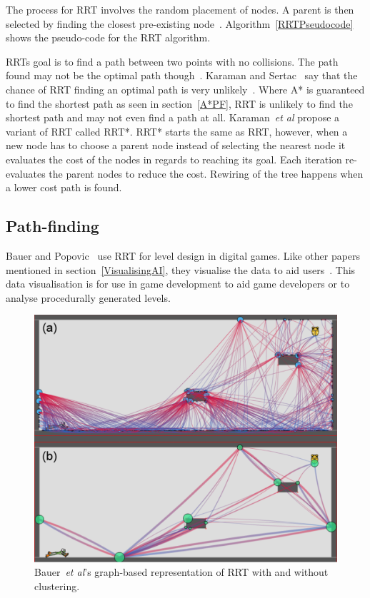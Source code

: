 \documentclass[journal]{IEEEtran}
\begin{document}
	The process for RRT involves the random placement of nodes. A parent is then selected by finding the closest pre-existing node~\cite{Kuffner2000}. Algorithm~\ref{RRTPseudocode} shows the pseudo-code for the RRT algorithm. 
	
	RRTs goal is to find a path between two points with no collisions.  The path found may not be the optimal path though~\cite{Kuffner2000, Karaman2011}. Karaman and Sertac~\cite{karaman2010} say that the chance of RRT finding an optimal path is very unlikely~\cite{karaman2010, Tremblay2014}. Where A* is guaranteed to find the shortest path as seen in section~\ref{A*PF}, RRT is unlikely to find the shortest path and may not even find a path at all.  
	Karaman~\textit{et al} propose a variant of RRT called RRT*. RRT* starts the same as RRT, however, when a new node has to choose a parent node instead of selecting the nearest node it evaluates the cost of the nodes in regards to reaching its goal. Each iteration re-evaluates the parent nodes to reduce the cost. Rewiring of the tree happens when a lower cost path is found.
	
	\subsection{Path-finding} \label{Pathfinding}
	Bauer and Popovic~\cite{bauer2012} use RRT for level design in digital games. Like other papers mentioned in section~\ref{VisualisingAI}, they visualise the data to aid users~\cite{bauer2012, Haworth2010}. This data visualisation is for use in game development to aid game developers or to analyse procedurally generated levels. 
	
	\begin{figure}[h]
		\includegraphics[width=1.0\linewidth]{BauerRRT.png}
		\caption{ Bauer~\textit{et al}'s\cite{bauer2012} graph-based representation of RRT with and without clustering.}
		\label{BauerRRT}
	\end{figure} 
	
\end{document}
